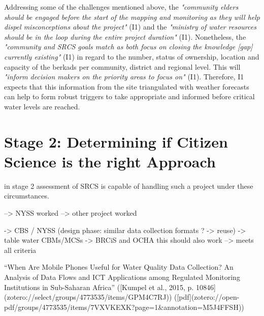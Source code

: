 Addressing some of the challenges mentioned above, the \textit{"community elders should be engaged before the start of the mapping and monitoring as they will help dispel misconceptions about the project"} (I1) and the \textit{"ministry of water resources should be in the loop during the entire project duration"} (I1). Nonetheless, the \textit{"community and SRCS goals match as both focus on closing the knowledge [gap] currently existing"} (I1) in regard to the number, status of ownership, location and capacity of the berkads per community, district and regional level. This will \textit{"inform decision makers on the priority areas to focus on"} (I1). Therefore, I1 expects that this information from the site triangulated with weather forecasts can help to form robust triggers to take appropriate and informed  before critical water levels are reached.









\section{Stage 2: Determining if Citizen Science is the right Approach}

in stage 2 assessment of SRCS is capable of handling such a project under these circumstances.



--> NYSS worked
--> other project worked

-> CBS / NYSS (design phase: similar data collection formats ? -> reuse)
-> table water CBMs/MCSs
-> BRCiS and OCHA
this should also work --> meets all criteria 


“When Are Mobile Phones Useful for Water Quality Data Collection? An Analysis of Data Flows and ICT Applications among Regulated Monitoring Institutions in Sub-Saharan Africa” ([Kumpel et al., 2015, p. 10846](zotero://select/groups/4773535/items/GPM4C7RJ)) ([pdf](zotero://open-pdf/groups/4773535/items/7VXVKEXK?page=1&annotation=M5J4FFSH))

